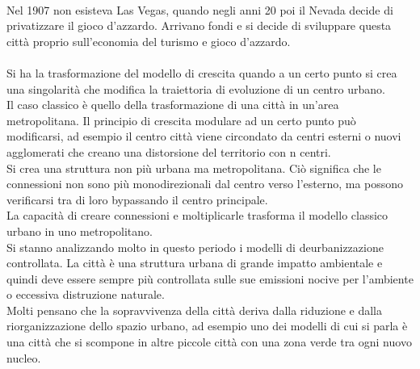 \documentclass[a4paper,12pt, oneside]{book}
\begin{document}
  \leavevmode\\
  Nel 1907 non esisteva Las Vegas, quando negli anni 20 poi il Nevada decide di privatizzare il gioco d'azzardo. Arrivano fondi e si decide di sviluppare questa città proprio sull'economia del turismo e gioco d'azzardo.\\ \\
  Si ha la trasformazione del modello di crescita quando a un certo punto si crea una singolarità che modifica la traiettoria di evoluzione di un centro urbano.\\
  Il caso classico è quello della trasformazione di una città in un'area metropolitana. Il principio di crescita modulare ad un certo punto può modificarsi, ad esempio il centro città viene circondato da centri esterni o nuovi agglomerati che creano una distorsione del territorio con n centri.\\
  Si crea una struttura non più urbana ma metropolitana. Ciò significa che le connessioni non sono più monodirezionali dal centro verso l'esterno, ma possono verificarsi tra di loro bypassando il centro principale.\\
  La capacità di creare connessioni e moltiplicarle trasforma il modello classico urbano in uno metropolitano.\\
  Si stanno analizzando molto in questo periodo i modelli di deurbanizzazione controllata. La città è una struttura urbana di grande impatto ambientale e quindi deve essere sempre più controllata sulle sue emissioni nocive per l'ambiente o eccessiva distruzione naturale.\\
  Molti pensano che la sopravvivenza della città deriva dalla riduzione e dalla riorganizzazione dello spazio urbano, ad esempio uno dei modelli di cui si parla è una città che si scompone in altre piccole città con una zona verde tra ogni nuovo nucleo.\\
\end{document}
